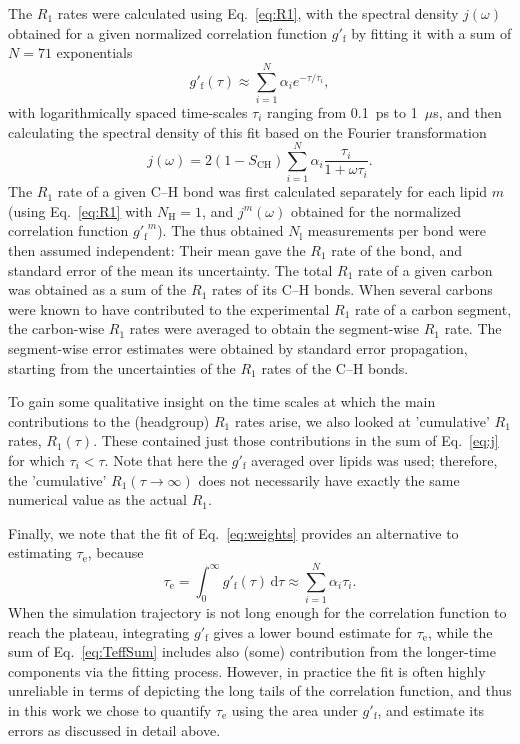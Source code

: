 \documentclass[journal=jpcbfk,manuscript=article,layout=twocolumn]{achemso}
\begin{document}
The $R_{1}$ rates were calculated using Eq.~\eqref{eq:R1},
%
with the spectral density $j(\omega)$ obtained for
a given normalized correlation function $g'_\mathrm f$
by fitting it with a sum of $N=71$ exponentials
\begin{equation}
\label{eq:weights}
g'_\mathrm{f}(\tau)\approx\sum_{i=1}^{N}\alpha_{i}e^{-\tau/\tau_{i}},
\end{equation}
with logarithmically spaced time-scales $\tau_{i}$ ranging from 0.1~ps to 1~$\mu$s, 
and then calculating the spectral density of this fit
based on the Fourier transformation\cite{ferreira15}
\begin{equation}
\label{eq:j}
j{(\omega)}=2(1-S_\mathrm{CH})\sum_{i=1}^{N}\alpha_{i}\frac{\tau_{i}}{1+\omega\tau_{i}} .
\end{equation}
%
The $R_{1}$ rate of a given C--H bond was
first calculated separately for each lipid $m$ (using Eq.~\eqref{eq:R1} with $N_\mathrm{H}=1$, and $j^m(\omega)$ obtained for the normalized correlation function ${g'_\mathrm f}^m$). The thus obtained $N_\mathrm{l}$ measurements per bond were then assumed independent:
Their mean gave the $R_1$ rate of the bond, and 
standard error of the mean its uncertainty.
%
The total $R_1$ rate of a given carbon was obtained as a sum of the $R_1$ rates of its C--H bonds.
%
When several carbons were known to have contributed to the experimental $R_1$ rate of a carbon segment, the carbon-wise $R_1$ rates were averaged to obtain the segment-wise $R_1$ rate.
%
The segment-wise error estimates were obtained by standard error propagation, starting from the uncertainties of the $R_1$ rates of the C--H bonds.

To gain some qualitative insight on the time scales at which the main contributions to the (headgroup) $R_1$ rates arise,
we also looked at 'cumulative' $R_1$ rates, $R_1(\tau)$. These
contained just those contributions in the sum of Eq.~\eqref{eq:j} for which $\tau_i<\tau$.
Note that here the $g'_\mathrm{f}$ averaged over lipids was used;
therefore, the 'cumulative' $R_1(\tau\to\infty)$ does not necessarily have exactly
the same numerical value as the actual $R_1$.

Finally, we note that the fit of Eq.~\eqref{eq:weights} provides an alternative
to estimating $\tau_\mathrm{e}$, because
\begin{equation}
\label{eq:TeffSum}
\tau_\mathrm{e}
	=\int_0^\infty\!g'_\mathrm f(\tau)\,\mathrm d\tau
	\approx\sum_{i=1}^{N}\alpha_{i}\tau_{i}.
\end{equation}
When the simulation trajectory is not long enough for the correlation function to reach the plateau, integrating $g'_\mathrm f$ gives a lower bound estimate for $\tau_\mathrm{e}$, while the sum of Eq.~\eqref{eq:TeffSum} includes also (some) contribution from the longer-time components via the fitting process.
However, in practice the fit is often highly unreliable in terms of depicting the long tails of the correlation function, and thus in this work we chose to quantify $\tau_\mathrm{e}$ using the area under $g'_\mathrm f$, and estimate its errors as discussed in detail above.
\end{document}
